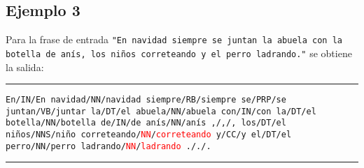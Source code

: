 \subsection*{Ejemplo 3}
Para la frase de entrada \texttt{"En navidad siempre se juntan la abuela con la botella de anís, los niños correteando y el perro ladrando."} se obtiene la salida: \newline
\noindent\rule{14cm}{0.4pt}\newline
\texttt{En/IN/En\newline
navidad/NN/navidad\newline
siempre/RB/siempre\newline
se/PRP/se\newline
juntan/VB/juntar\newline
la/DT/el\newline
abuela/NN/abuela\newline
con/IN/con\newline
la/DT/el\newline
botella/NN/botella\newline
de/IN/de\newline
anís/NN/anís\newline
,/,/,\newline
los/DT/el\newline
niños/NNS/niño\newline
correteando/\textcolor{red}{NN}/\textcolor{red}{correteando}\newline
y/CC/y\newline
el/DT/el\newline
perro/NN/perro\newline
ladrando/\textcolor{red}{NN}/\textcolor{red}{ladrando}\newline
././.\newline
}
\noindent\rule{14cm}{0.4pt}\newline